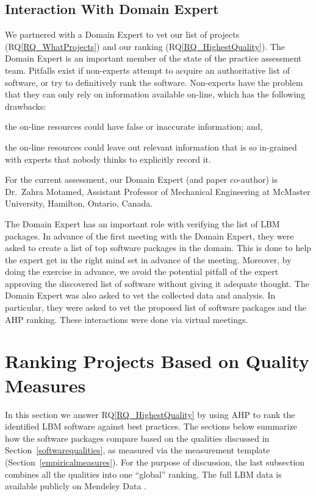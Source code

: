 \documentclass[final, 3p, times, authoryear]{elsarticle}
\newcommand{\rqref}[1]{RQ\ref{#1}}
\begin{document}
\subsection{Interaction With Domain Expert} \label{sec_vet_software_list}

We partnered with a Domain Expert to vet our list of projects
(\rqref{RQ_WhatProjects}) and our ranking (\rqref{RQ_HighestQuality}).  The
Domain Expert is an important member of the state of the practice assessment
team. Pitfalls exist if non-experts attempt to acquire an authoritative list of
software, or try to definitively rank the software. Non-experts have the problem
that they can only rely on information available on-line, which has the
following drawbacks:
\begin{inparaenum}[i)]
  \item the on-line resources could have false or inaccurate information; and,
  \item the on-line resources could leave out relevant information that is so
in-grained with experts that nobody thinks to explicitly record it.
\end{inparaenum}
For the current assessment, our Domain Expert (and paper co-author) is Dr.\
Zahra Motamed, Assistant Professor of Mechanical Engineering at McMaster
University, Hamilton, Ontario, Canada.  

The Domain Expert has an important role with verifying the list of LBM packages.
In advance of the first meeting with the Domain Expert, they were asked to
create a list of top software packages in the domain.  This is done to help the
expert get in the right mind set in advance of the meeting.  Moreover, by doing
the exercise in advance, we avoid the potential pitfall of the expert approving
the discovered list of software without giving it adequate thought.  The Domain
Expert was also asked to vet the collected data and analysis.  In particular,
they were asked to vet the proposed list of software packages and the AHP
ranking.  These interactions were done via virtual meetings.

\section{Ranking Projects Based on Quality Measures} \label{AHPresults}

In this section we answer \rqref{RQ_HighestQuality} by using AHP to rank the
identified LBM software against best practices.  The sections below summarize
how the software packages compare based on the qualities discussed in
Section~\ref{softwarequalities}, as measured via the measurement template
(Section~\ref{empiricalmeasures}).  For the purpose of discussion, the last
subsection combines all the qualities into one ``global'' ranking.  The full LBM
data is available publicly on Mendeley Data \citep{Smith2022}.
\end{document}
